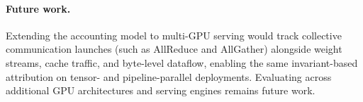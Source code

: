 \paragraph{Future work.}
Extending the accounting model to multi-GPU serving would track collective communication
launches (such as AllReduce and AllGather) alongside weight streams, cache traffic, and
byte-level dataflow, enabling the same invariant-based attribution on tensor- and
pipeline-parallel deployments.
Evaluating \sys{} across additional GPU architectures and serving engines remains future
work.
